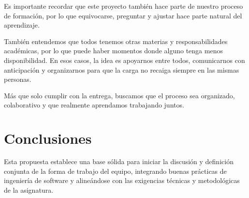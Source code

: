 \documentclass[12pt]{article}
\begin{document}
Es importante recordar que este proyecto también hace parte de nuestro proceso de formación, por lo que equivocarse, preguntar y ajustar hace parte natural del aprendizaje.

También entendemos que todos tenemos otras materias y responsabilidades académicas, por lo que puede haber momentos donde alguno tenga menos disponibilidad. En esos casos, la idea es apoyarnos entre todos, comunicarnos con anticipación y organizarnos para que la carga no recaiga siempre en las mismas personas.

Más que solo cumplir con la entrega, buscamos que el proceso sea organizado, colaborativo y que realmente aprendamos trabajando juntos.



\section{Conclusiones}

Esta propuesta establece una base sólida para iniciar la discusión y definición conjunta de la forma de trabajo del equipo, integrando buenas prácticas de ingeniería de software y alineándose con las exigencias técnicas y metodológicas de la asignatura.
\end{document}
